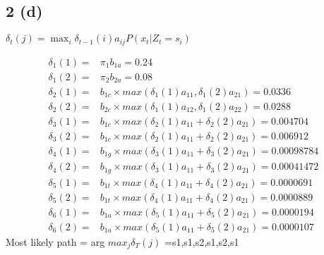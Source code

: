 \documentclass[10pt,letterpaper]{article}
\begin{document}
\subsection{2 (d)}
$\delta_t(j) = \max_i \delta_{t-1}(i) a_{ij} P(x_t|Z_t=s_i)$

\begin{align*}
\delta_1(1) = & \pi_1 b_{1a} =0.24 \\
\delta_1(2) = &\pi_2 b_{2a} =0.08 \\
\delta_2(1) = & b_{1c} \times max(\delta_1(1)a_{11}, \delta_1(2)a_{21}) =0.0336\\
\delta_2(2) = & b_{2c} \times max(\delta_1(1)a_{12}, \delta_1(2)a_{22}) = 0.0288\\
\delta_3(1) = &b_{1c} \times max (\delta_2(1)a_{11} + \delta_2(2)a_{21} )=0.004704\\
\delta_3(2) = &b_{1c} \times max (\delta_2(1)a_{11} + \delta_2(2)a_{21} )=0.006912\\
\delta_4(1) = &b_{1g} \times max(\delta_3(1)a_{11} + \delta_3(2)a_{21} )=0.00098784\\
\delta_4(2) = &b_{1g} \times max(\delta_3(1)a_{11} + \delta_3(2)a_{21} )=0.00041472\\
\delta_5(1) = &b_{1t} \times max(\delta_4(1)a_{11} + \delta_4(2)a_{21} )=0.0000691\\
\delta_5(2) = &b_{1t} \times max(\delta_4(1)a_{11} + \delta_4(2)a_{21} )=0.0000889\\
\delta_6(1) = &b_{1a} \times max(\delta_5(1)a_{11} + \delta_5(2)a_{21} )=0.0000194\\
\delta_6(2) = &b_{1a} \times max(\delta_5(1)a_{11} + \delta_5(2)a_{21} )=0.0000107
\end{align*}
Most likely path = arg $ max_j \delta_T(j)$ =s1,s1,s2,s1,s2,s1
\end{document}
